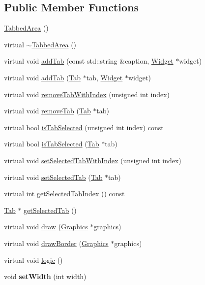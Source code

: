 \subsection*{Public Member Functions}
\begin{DoxyCompactItemize}
\item 
\hyperlink{classgcn_1_1TabbedArea_aed578d5b2a0c072ff77e79782d52dc28}{Tabbed\+Area} ()
\item 
virtual \hyperlink{classgcn_1_1TabbedArea_affdf70918265af9d18145f9cd21c3d24}{$\sim$\+Tabbed\+Area} ()
\item 
virtual void \hyperlink{classgcn_1_1TabbedArea_a84753d8bf44694e4a1c7a8050f903540}{add\+Tab} (const std\+::string \&caption, \hyperlink{classgcn_1_1Widget}{Widget} $\ast$widget)
\item 
virtual void \hyperlink{classgcn_1_1TabbedArea_aba5478d208073e5a7f9cc799f6d6f706}{add\+Tab} (\hyperlink{classgcn_1_1Tab}{Tab} $\ast$tab, \hyperlink{classgcn_1_1Widget}{Widget} $\ast$widget)
\item 
virtual void \hyperlink{classgcn_1_1TabbedArea_a3a8fc1e6c3609f0567c3419bcf865500}{remove\+Tab\+With\+Index} (unsigned int index)
\item 
virtual void \hyperlink{classgcn_1_1TabbedArea_aa813aba837a253e3d8c23d77b529f7ce}{remove\+Tab} (\hyperlink{classgcn_1_1Tab}{Tab} $\ast$tab)
\item 
virtual bool \hyperlink{classgcn_1_1TabbedArea_a14a7d3980448832bd1e7bfc650a31fe1}{is\+Tab\+Selected} (unsigned int index) const 
\item 
virtual bool \hyperlink{classgcn_1_1TabbedArea_aa299c2a2151307db1cc095c8bbf60289}{is\+Tab\+Selected} (\hyperlink{classgcn_1_1Tab}{Tab} $\ast$tab)
\item 
virtual void \hyperlink{classgcn_1_1TabbedArea_ae2df5d32eb72072615a1cdef27e1b862}{set\+Selected\+Tab\+With\+Index} (unsigned int index)
\item 
virtual void \hyperlink{classgcn_1_1TabbedArea_a0f869364a98aaaac589eeeaf90c7fd99}{set\+Selected\+Tab} (\hyperlink{classgcn_1_1Tab}{Tab} $\ast$tab)
\item 
virtual int \hyperlink{classgcn_1_1TabbedArea_a05e02eaf4de1f3ea4471a882eb3eb59c}{get\+Selected\+Tab\+Index} () const 
\item 
\hyperlink{classgcn_1_1Tab}{Tab} $\ast$ \hyperlink{classgcn_1_1TabbedArea_ab41289b4485a54860d2442e346633806}{get\+Selected\+Tab} ()
\item 
virtual void \hyperlink{classgcn_1_1TabbedArea_ad7abaa45021349d40becd9603106b844}{draw} (\hyperlink{classgcn_1_1Graphics}{Graphics} $\ast$graphics)
\item 
virtual void \hyperlink{classgcn_1_1TabbedArea_aa5ea5876476beaa9c6badc87bccd221c}{draw\+Border} (\hyperlink{classgcn_1_1Graphics}{Graphics} $\ast$graphics)
\item 
virtual void \hyperlink{classgcn_1_1TabbedArea_a4adbdd819c9af603b20728d6e4cd5ce9}{logic} ()
\item 
void {\bfseries set\+Width} (int width)\hypertarget{classgcn_1_1TabbedArea_ad6d054c9472cf00bc07cb02bddef765c}{}\label{classgcn_1_1TabbedArea_ad6d054c9472cf00bc07cb02bddef765c}


\end{DoxyCompactItemize}
